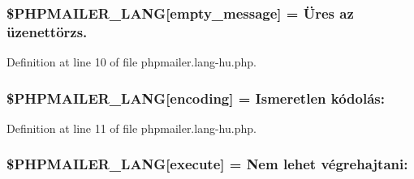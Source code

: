 \subsubsection[{\texorpdfstring{\$\+P\+H\+P\+M\+A\+I\+L\+E\+R\+\_\+\+L\+A\+NG}{$PHPMAILER_LANG}}]{\setlength{\rightskip}{0pt plus 5cm}\$P\+H\+P\+M\+A\+I\+L\+E\+R\+\_\+\+L\+A\+NG\mbox{[}\textquotesingle{}empty\+\_\+message\textquotesingle{}\mbox{]} = \textquotesingle{}Üres az üzenettörzs.\textquotesingle{}}\hypertarget{phpmailer_8lang-hu_8php_a33772099f637c9d6c2cd7425e0e37fed}{}\label{phpmailer_8lang-hu_8php_a33772099f637c9d6c2cd7425e0e37fed}


Definition at line 10 of file phpmailer.\+lang-\/hu.\+php.

\subsubsection[{\texorpdfstring{\$\+P\+H\+P\+M\+A\+I\+L\+E\+R\+\_\+\+L\+A\+NG}{$PHPMAILER_LANG}}]{\setlength{\rightskip}{0pt plus 5cm}\$P\+H\+P\+M\+A\+I\+L\+E\+R\+\_\+\+L\+A\+NG\mbox{[}\textquotesingle{}encoding\textquotesingle{}\mbox{]} = \textquotesingle{}Ismeretlen kódolás\+: \textquotesingle{}}\hypertarget{phpmailer_8lang-hu_8php_a817f7283f3d54c970a0c10305cc668cc}{}\label{phpmailer_8lang-hu_8php_a817f7283f3d54c970a0c10305cc668cc}


Definition at line 11 of file phpmailer.\+lang-\/hu.\+php.

\subsubsection[{\texorpdfstring{\$\+P\+H\+P\+M\+A\+I\+L\+E\+R\+\_\+\+L\+A\+NG}{$PHPMAILER_LANG}}]{\setlength{\rightskip}{0pt plus 5cm}\$P\+H\+P\+M\+A\+I\+L\+E\+R\+\_\+\+L\+A\+NG\mbox{[}\textquotesingle{}execute\textquotesingle{}\mbox{]} = \textquotesingle{}Nem lehet végrehajtani\+: \textquotesingle{}}\hypertarget{phpmailer_8lang-hu_8php_a668217a9563a168f30f2a8548b6ed5a9}{}\label{phpmailer_8lang-hu_8php_a668217a9563a168f30f2a8548b6ed5a9}


